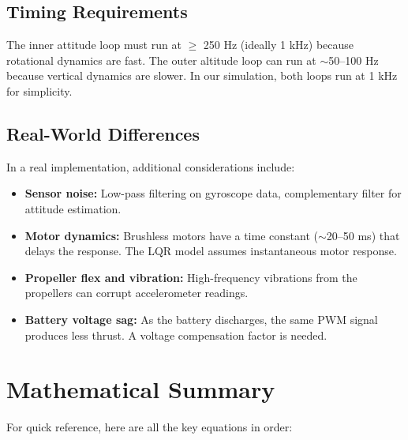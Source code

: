 \documentclass[12pt, a4paper]{article}
\begin{document}
\subsection{Timing Requirements}

The inner attitude loop must run at $\geq$ 250 Hz (ideally 1 kHz) because rotational dynamics are fast.  The outer altitude loop can run at $\sim$50--100 Hz because vertical dynamics are slower.  In our simulation, both loops run at 1 kHz for simplicity.

\subsection{Real-World Differences}

In a real implementation, additional considerations include:
\begin{itemize}
    \item \textbf{Sensor noise:} Low-pass filtering on gyroscope data, complementary filter for attitude estimation.
    \item \textbf{Motor dynamics:} Brushless motors have a time constant ($\sim$20--50 ms) that delays the response.  The LQR model assumes instantaneous motor response.
    \item \textbf{Propeller flex and vibration:} High-frequency vibrations from the propellers can corrupt accelerometer readings.
    \item \textbf{Battery voltage sag:} As the battery discharges, the same PWM signal produces less thrust.  A voltage compensation factor is needed.
\end{itemize}

\section{Mathematical Summary}
\label{sec:math_summary}

For quick reference, here are all the key equations in order:
\end{document}
